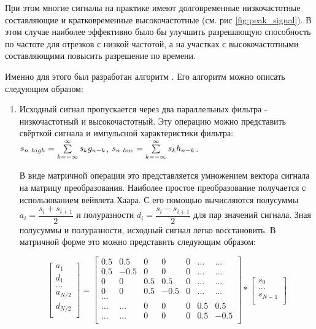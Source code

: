 
При этом многие сигналы на практике имеют долговременные низкочастотные составляющие и кратковременные высокочастотные (см. рис \ref{fig:peak_signal}\cite{wavelet_tutorial}). В этом случае наиболее эффективно было бы улучшить разрешающую способность по частоте для отрезков с низкой частотой, а на участках с высокочастотными составляющими повысить разрешение по времени. 

Именно для этого был разработан алгоритм . Его алгоритм можно описать следующим образом:

\begin{enumerate}
\item Исходный сигнал пропускается через два параллельных фильтра - низкочастотный и высокочастотный. Эту операцию можно представить свёрткой сигнала и импульсной характеристики фильтра: $s_{n~high}=\sum\limits_{k=-\infty}^{\infty}s_kg_{n-k}$, $s_{n~low}=\sum\limits_{k=-\infty}^{\infty}s_kh_{n-k}$. 

В виде матричной операции это представляется умножением вектора сигнала на матрицу преобразования. Наиболее простое преобразование получается с использованием вейвлета Хаара. С его помощью вычисляются полусуммы $a_i=\dfrac{s_i+s_{i+1}}{2}$ и полуразности $d_i=\dfrac{s_i-s_{i+1}}{2}$ для пар значений сигнала. Зная полусуммы и полуразности, исходный сигнал легко восстановить. В матричной форме это можно представить следующим образом:

\begin{displaymath}
  \begin{bmatrix}
    a_1 \\
    d_1 \\
    \ldots \\
    a_{N/2} \\
    d_{N/2} \\
  \end{bmatrix}
  =
  \begin{bmatrix}
    0.5 & 0.5  & 0 & 0 & 0 & \ldots & \ldots \\
    0.5 & -0.5 & 0 & 0 & 0 & \ldots & \ldots \\
    0 & 0 & 0.5 & 0.5 & 0 &  \ldots & \ldots \\
    0 & 0 & 0.5 & -0.5 & 0 &  \ldots & \ldots \\  
    \ldots \\
    \ldots & \ldots & 0 & 0 & 0& 0.5 & 0.5\\
    \ldots & \ldots & 0 & 0 & 0& 0.5 & -0.5\\
  \end{bmatrix}
  *
  \begin{bmatrix}
    s_0 \\
    \ldots \\
    s_{N-1} \\
  \end{bmatrix}
\end{displaymath}



\end{enumerate}
